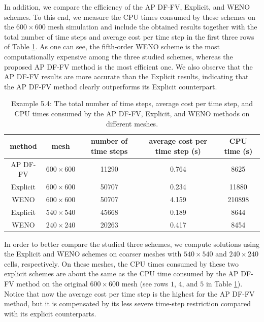 \documentclass[a4paper,11pt,twoside]{article}
\numberwithin{equation}{section}
\numberwithin{figure}{section}
\numberwithin{table}{section}
\begin{document}
\begin{example}
In addition, we compare the efficiency of the AP DF-FV, Explicit, and WENO schemes. To this end, we measure the CPU times consumed by these 
schemes on the $600\times600$ mesh simulation and include the obtained results together with the total number of time steps and average
cost per time step in the first three rows of Table \ref{table4}. As one can see, the fifth-order WENO scheme is the most computationally 
expensive among the three studied schemes, whereas the proposed AP DF-FV method is the most efficient one. We also observe that the AP DF-FV
results are more accurate than the Explicit results, indicating that the AP DF-FV method clearly outperforms its Explicit counterpart.
\begin{table}[!ht]
\centering
\begin{tabular}{|c|c|c|c|c|}
\hline
method&mesh&number of time steps&average cost per time step (s) &CPU time (s)\\ 
\hline
AP DF-FV&$600\times600$&11290&0.764&8625\\ 
\hline
Explicit&$600\times600$&50707&0.234&11880\\ 
\hline
WENO&$600\times600$&50707&4.159&210898\\ 
\hline
Explicit&$540\times540$&45668&0.189&8644\\
\hline		
WENO&$240\times240$&20263&0.417&8454\\
\hline
\end{tabular}
\caption{\sf Example 5.4: The total number of time steps, average cost per time step, and CPU times consumed by the AP DF-FV, Explicit, and 
WENO methods on different meshes.\label{table4}}
\end{table}
	
In order to better compare the studied three schemes, we compute solutions using the Explicit and WENO schemes on coarser meshes with 
$540\times540$ and $240\times240$ cells, respectively. On these meshes, the CPU times consumed by these two explicit schemes are about the 
same as the CPU time consumed by the AP DF-FV method on the original $600\times600$ mesh (see rows $1$, $4$, and $5$ in Table \ref{table4}).
Notice that now the average cost per time step is the highest for the AP DF-FV method, but it is compensated by its less severe time-step
restriction compared with its explicit counterparts.
	

\end{example}
\end{document}
